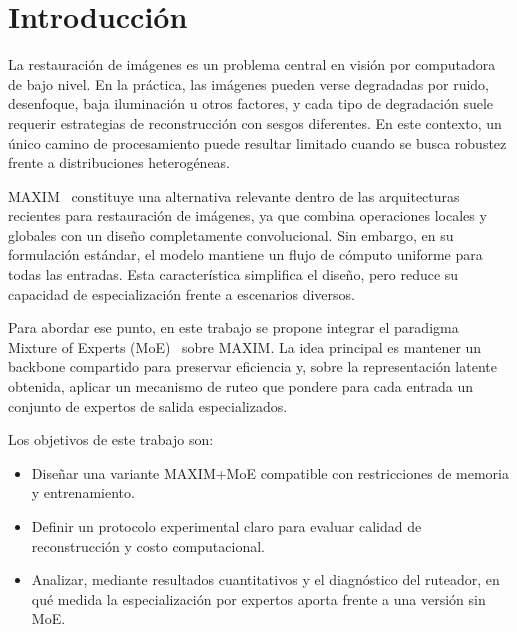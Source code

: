 \documentclass[aps,prl,twocolumn,groupedaddress]{revtex4-2}
\begin{document}

\maketitle

\section{Introducción}

La restauración de imágenes es un problema central en visión por computadora de bajo nivel. En la práctica, las imágenes pueden verse degradadas por ruido, desenfoque, baja iluminación u otros factores, y cada tipo de degradación suele requerir estrategias de reconstrucción con sesgos diferentes. En este contexto, un único camino de procesamiento puede resultar limitado cuando se busca robustez frente a distribuciones heterogéneas.

MAXIM~\cite{tu2022maxim} constituye una alternativa relevante dentro de las arquitecturas recientes para restauración de imágenes, ya que combina operaciones locales y globales con un diseño completamente convolucional. Sin embargo, en su formulación estándar, el modelo mantiene un flujo de cómputo uniforme para todas las entradas. Esta característica simplifica el diseño, pero reduce su capacidad de especialización frente a escenarios diversos.

Para abordar ese punto, en este trabajo se propone integrar el paradigma Mixture of Experts (MoE)~\cite{jacobs1991mixtures,shazeer2017moe} sobre MAXIM. La idea principal es mantener un backbone compartido para preservar eficiencia y, sobre la representación latente obtenida, aplicar un mecanismo de ruteo que pondere para cada entrada un conjunto de expertos de salida especializados.

Los objetivos de este trabajo son:
\begin{itemize}
    \item Diseñar una variante MAXIM+MoE compatible con restricciones de memoria y entrenamiento.
    \item Definir un protocolo experimental claro para evaluar calidad de reconstrucción y costo computacional.
    \item Analizar, mediante resultados cuantitativos y el diagnóstico del ruteador, en qué medida la especialización por expertos aporta frente a una versión sin MoE.
\end{itemize}
\end{document}
